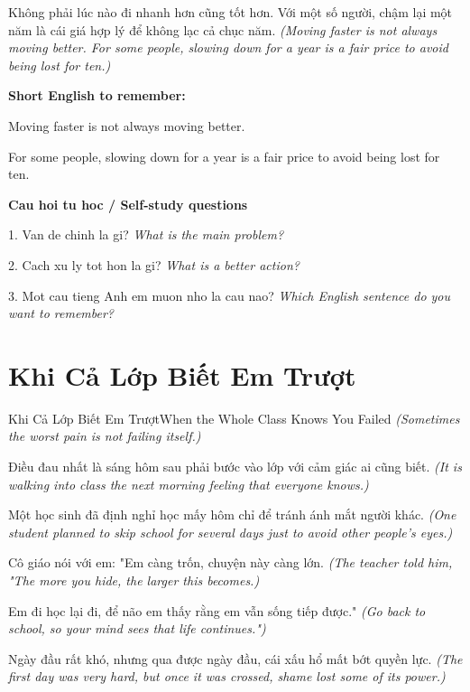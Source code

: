 \begin{baihoc}
Không phải lúc nào đi nhanh hơn cũng tốt hơn. Với một số người, chậm lại một năm là cái giá hợp lý để không lạc cả chục năm.
\textit{(Moving faster is not always moving better. For some people, slowing down for a year is a fair price to avoid being lost for ten.)}
\end{baihoc}

\begin{ghinhoanh}
\textbf{Short English to remember:}

Moving faster is not always moving better.

For some people, slowing down for a year is a fair price to avoid being lost for ten.

\end{ghinhoanh}

\begin{tuhocnhanh}
\textbf{Cau hoi tu hoc / Self-study questions}

1. Van de chinh la gi? \textit{What is the main problem?}

2. Cach xu ly tot hon la gi? \textit{What is a better action?}

3. Mot cau tieng Anh em muon nho la cau nao? \textit{Which English sentence do you want to remember?}
\end{tuhocnhanh}
\ngancach

\section{Khi Cả Lớp Biết Em Trượt}
\begin{truyen}{Khi Cả Lớp Biết Em Trượt}{When the Whole Class Knows You Failed}
\textit{(Sometimes the worst pain is not failing itself.)}

Điều đau nhất là sáng hôm sau phải bước vào lớp với cảm giác ai cũng biết.
\textit{(It is walking into class the next morning feeling that everyone knows.)}

Một học sinh đã định nghỉ học mấy hôm chỉ để tránh ánh mắt người khác.
\textit{(One student planned to skip school for several days just to avoid other people’s eyes.)}

Cô giáo nói với em: "Em càng trốn, chuyện này càng lớn.
\textit{(The teacher told him, "The more you hide, the larger this becomes.)}

Em đi học lại đi, để não em thấy rằng em vẫn sống tiếp được."
\textit{(Go back to school, so your mind sees that life continues.")}

Ngày đầu rất khó, nhưng qua được ngày đầu, cái xấu hổ mất bớt quyền lực.
\textit{(The first day was very hard, but once it was crossed, shame lost some of its power.)}

\end{truyen}


